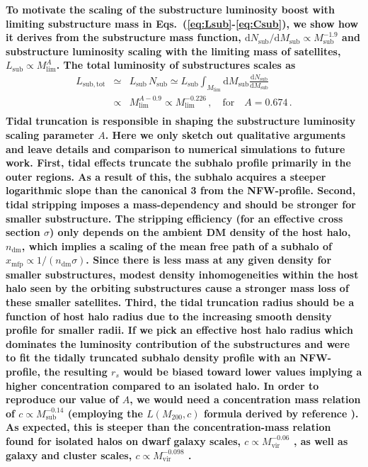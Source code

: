 \documentclass[10pt,aps,pra,reprint,amsmath,amsfonts,amssymb,showpacs,nofootinbib,floatfix]{revtex4-1}
\def\C#1{{\bf #1}}
\newcommand{\rmn}{\mathrm}
\newcommand{\sub}{\rmn{sub}}
\newcommand{\dd}{\rmn{d}}
\newcommand{\rs}{\ensuremath{r_s}}
\begin{document}
\C{To motivate the scaling of the substructure luminosity boost with limiting
  substructure mass in Eqs.~(\ref{eq:Lsub}-\ref{eq:Csub}), we show how it
  derives from the substructure mass function, $\dd N_\sub/\dd M_\rmn{sub}
  \propto M_\rmn{sub}^{-1.9}$ \cite{2008MNRAS.391.1685S,2008Natur.456...73S} and
  substructure luminosity scaling with the limiting mass of satellites, $L_\sub
  \propto M_\rmn{lim}^A$. The total luminosity of substructures scales as
\begin{eqnarray}
  L_\rmn{sub,tot} &\simeq& L_\sub\,N_\sub \simeq L_\sub 
\int_{M_\rmn{lim}} \dd M_\rmn{sub} \frac{\dd N_\sub}{\dd M_\rmn{sub}} \nonumber\\
 &\propto& M_\rmn{lim}^{A-0.9} \propto M_\rmn{lim}^{-0.226}\,,\quad
\rmn{for}\quad A=0.674\,. \nonumber\\
&&
\end{eqnarray}
Tidal truncation is responsible in shaping the substructure luminosity scaling
parameter $A$. Here we only sketch out qualitative arguments and leave details
and comparison to numerical simulations to future work. First, tidal effects
truncate the subhalo profile primarily in the outer regions. As a result of
this, the subhalo acquires a steeper logarithmic slope than the canonical 3 from
the NFW-profile. Second, tidal stripping imposes a mass-dependency and should be
stronger for smaller substructure.  The stripping efficiency (for an effective
cross section $\sigma$) only depends on the ambient DM density of the host halo,
$n_\rmn{dm}$, which implies a scaling of the mean free path of a subhalo of
$x_\rmn{mfp} \propto 1/(n_\rmn{dm} \sigma)$. Since there is less mass at any
given density for smaller substructures, modest density inhomogeneities within
the host halo seen by the orbiting substructures cause a stronger mass loss of
these smaller satellites. Third, the tidal truncation radius should be a
function of host halo radius due to the increasing smooth density profile for
smaller radii.  If we pick an effective host halo radius which dominates the
luminosity contribution of the substructures and were to fit the tidally
truncated subhalo density profile with an NFW-profile, the resulting $\rs$ would
be biased toward lower values implying a higher concentration compared to an
isolated halo. In order to reproduce our value of $A$, we would need a
concentration mass relation of $c\propto M_\rmn{sub}^{-0.14}$ (employing the
$L(M_{200},c)$ formula derived by reference \cite{2009PhRvL.103r1302P}).  As expected,
this is steeper than the concentration-mass relation found for isolated halos on
dwarf galaxy scales, $c \propto M_\rmn{vir}^{-0.06}$ \cite{2011arXiv1101.2020I},
as well as galaxy and cluster scales, $c \propto M_\rmn{vir}^{-0.098}$
\cite{2008MNRAS.391.1940M}.}
\end{document}
